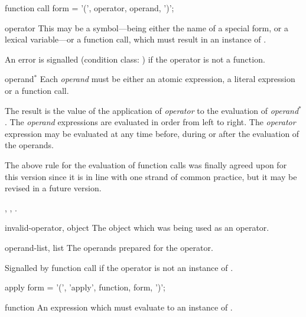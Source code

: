 \begin{optDefinition}
%
\Syntax
\savesyntax\functioncallSyntax\vbox{\syntax
function call form
   = '(', operator, {operand}, ')';
\endsyntax}
%
\begin{arguments}
    \item[operator] This may be a symbol---being either the name of a special
    form, or a lexical variable---or a function call, which must result in an
    instance of .

    An error is signalled (condition class:
    ) if the
    operator is not a function.

    \item[operand\/$^*$] Each {\em operand} must be either an atomic expression,
    a literal expression or a function call.
\end{arguments}
%
\result%
The result is the value of the application of {\em operator} to the
evaluation of {\em operand\/$^*$}.
%
\remarks%
The {\em operand} expressions are evaluated in order from left to
right.  The {\em operator} expression may be evaluated at any time
before, during or after the evaluation of the operands.
%
\begin{note}
    The above rule for the evaluation of function calls was finally agreed upon
    for this version since it is in line with one strand of common practice, but
    it may be revised in a future version.
\end{note}
%
\seealso%
, , .

%
\begin{initoptions}
    \item[invalid-operator, object] The object which was being used as an
    operator.

    \item[operand-list, list] The operands prepared for the operator.
\end{initoptions}
%
\remarks%
Signalled by function call if the operator is not an instance of
.

%
\Syntax
\savesyntax\applySyntax\vbox{\syntax
apply form
   = '(', 'apply', function, {form}, ')';
\endsyntax}
%
\begin{arguments}
    \item[function] An expression which must evaluate to an instance of
    .


\end{arguments}
\end{optDefinition}
